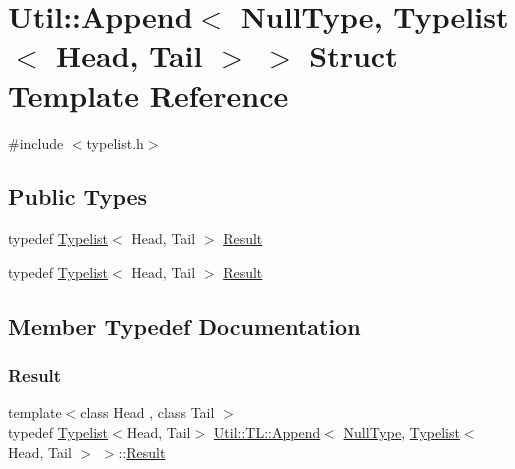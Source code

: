 \hypertarget{structUtil_1_1TL_1_1Append_3_01NullType_00_01Typelist_3_01Head_00_01Tail_01_4_01_4}{}\section{Util\+:\+:Append$<$ Null\+Type, Typelist$<$ Head, Tail $>$ $>$ Struct Template Reference}
\label{structUtil_1_1TL_1_1Append_3_01NullType_00_01Typelist_3_01Head_00_01Tail_01_4_01_4}


{\ttfamily \#include $<$typelist.\+h$>$}

\subsection*{Public Types}
\begin{DoxyCompactItemize}
\item 
typedef \mbox{\hyperlink{structUtil_1_1Typelist}{Typelist}}$<$ Head, Tail $>$ \mbox{\hyperlink{structUtil_1_1TL_1_1Append_3_01NullType_00_01Typelist_3_01Head_00_01Tail_01_4_01_4_aa4d82c7dd5a87a41fa2e1a0046427d13}{Result}}
\item 
typedef \mbox{\hyperlink{structUtil_1_1Typelist}{Typelist}}$<$ Head, Tail $>$ \mbox{\hyperlink{structUtil_1_1TL_1_1Append_3_01NullType_00_01Typelist_3_01Head_00_01Tail_01_4_01_4_aa4d82c7dd5a87a41fa2e1a0046427d13}{Result}}
\end{DoxyCompactItemize}


\subsection{Member Typedef Documentation}
\mbox{\label{structUtil_1_1TL_1_1Append_3_01NullType_00_01Typelist_3_01Head_00_01Tail_01_4_01_4_aa4d82c7dd5a87a41fa2e1a0046427d13}} 
\subsubsection{\texorpdfstring{Result}{Result}\hspace{0.1cm}{\footnotesize\ttfamily [1/2]}}
{\footnotesize\ttfamily template$<$class Head , class Tail $>$ \\
typedef \mbox{\hyperlink{structUtil_1_1Typelist}{Typelist}}$<$Head, Tail$>$ \mbox{\hyperlink{structUtil_1_1TL_1_1Append}{Util\+::\+T\+L\+::\+Append}}$<$ \mbox{\hyperlink{classUtil_1_1NullType}{Null\+Type}}, \mbox{\hyperlink{structUtil_1_1Typelist}{Typelist}}$<$ Head, Tail $>$ $>$\+::\mbox{\hyperlink{structUtil_1_1TL_1_1Append_3_01NullType_00_01Typelist_3_01Head_00_01Tail_01_4_01_4_aa4d82c7dd5a87a41fa2e1a0046427d13}{Result}}}

